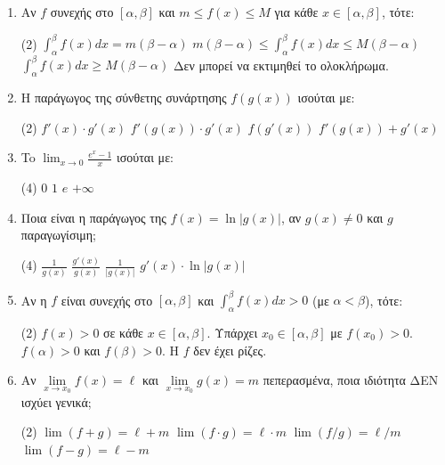\documentclass[11pt,a4paper]{article}
\renewcommand{\textdexiakeraia}{}
\newcommand{\dint}{\displaystyle\int}
\begin{document}
\begin{enumerate}[label=\textbf{\arabic*.}, itemsep=4mm]
    \item Αν $f$ συνεχής στο $[\alpha, \beta]$ και $m \le f(x) \le M$ για κάθε $x \in [\alpha, \beta]$, τότε:
    \begin{tasks}[label=\let\textdexiakeraia\relax\alph*.](2)
        \task $\dint_\alpha^\beta f(x) dx = m(\beta - \alpha)$
        \task $m(\beta-\alpha) \le \dint_\alpha^\beta f(x) dx \le M(\beta-\alpha)$
        \task $\dint_\alpha^\beta f(x)dx \ge M(\beta-\alpha)$
        \task Δεν μπορεί να εκτιμηθεί το ολοκλήρωμα.
    \end{tasks}

    \item Η παράγωγος της σύνθετης συνάρτησης $f(g(x))$ ισούται με:
    \begin{tasks}[label=\let\textdexiakeraia\relax\alph*.](2)
        \task $f'(x) \cdot g'(x)$
        \task $f'(g(x)) \cdot g'(x)$
        \task $f(g'(x))$
        \task $f'(g(x)) + g'(x)$
    \end{tasks}

    \item To $\displaystyle\lim_{x\to 0} \frac{e^x - 1}{x}$ ισούται με:
    \begin{tasks}[label=\let\textdexiakeraia\relax\alph*.](4)
        \task $0$
        \task $1$
        \task $e$
        \task $+\infty$
    \end{tasks}

    \item Ποια είναι η παράγωγος της $f(x) = \ln|g(x)|$, αν $g(x) \ne 0$ και $g$ παραγωγίσιμη;
    \begin{tasks}[label=\let\textdexiakeraia\relax\alph*.](4)
        \task $\frac{1}{g(x)}$
        \task $\frac{g'(x)}{g(x)}$
        \task $\frac{1}{|g(x)|}$
        \task $g'(x) \cdot \ln|g(x)|$
    \end{tasks}

    \item Αν η $f$ είναι συνεχής στο $[\alpha, \beta]$ και $\dint_\alpha^\beta f(x)dx > 0$ (με $\alpha < \beta$), τότε:
    \begin{tasks}[label=\let\textdexiakeraia\relax\alph*.](2)
        \task $f(x) > 0$ σε κάθε $x \in [\alpha, \beta]$.
        \task Υπάρχει $x_0 \in [\alpha, \beta]$ με $f(x_0) > 0$.
        \task $f(\alpha) > 0$ και $f(\beta) > 0$.
        \task H $f$ δεν έχει ρίζες.
    \end{tasks}

    \item Αν $\lim\limits_{x\to x_0} f(x) = \ell$ και $\lim\limits_{x\to x_0} g(x) = m$ πεπερασμένα, ποια ιδιότητα ΔΕΝ ισχύει γενικά;
    \begin{tasks}[label=\let\textdexiakeraia\relax\alph*.](2)
        \task $\lim (f+g) = \ell + m$
        \task $\lim (f \cdot g) = \ell \cdot m$
        \task $\lim (f/g) = \ell/m$
        \task $\lim (f - g) = \ell - m$
    \end{tasks}


\end{enumerate}
\end{document}
